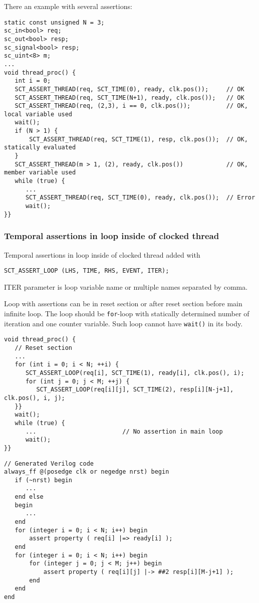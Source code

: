 There an example with several assertions:

\begin{lstlisting}[style=mycpp]
static const unsigned N = 3;
sc_in<bool> req;
sc_out<bool> resp;
sc_signal<bool> resp;
sc_uint<8> m;
...
void thread_proc() {
   int i = 0;
   SCT_ASSERT_THREAD(req, SCT_TIME(0), ready, clk.pos());     // OK
   SCT_ASSERT_THREAD(req, SCT_TIME(N+1), ready, clk.pos());   // OK 
   SCT_ASSERT_THREAD(req, (2,3), i == 0, clk.pos());          // OK, local variable used
   wait();
   if (N > 1) {
       SCT_ASSERT_THREAD(req, SCT_TIME(1), resp, clk.pos());  // OK, statically evaluated
   }
   SCT_ASSERT_THREAD(m > 1, (2), ready, clk.pos())            // OK, member variable used
   while (true) {   
      ...
      SCT_ASSERT_THREAD(req, SCT_TIME(0), ready, clk.pos());  // Error
      wait();
}}
\end{lstlisting}

\subsubsection{Temporal assertions in loop inside of clocked thread}

Temporal assertions in loop inside of clocked thread added with 
\begin{lstlisting}[style=mycpp]
SCT_ASSERT_LOOP (LHS, TIME, RHS, EVENT, ITER);
\end{lstlisting}
%
ITER parameter is loop variable name or multiple names separated by comma.

Loop with assertions can be in reset section or after reset section before main infinite loop. The loop should be {\tt for}-loop with statically determined number of iteration and one counter variable. Such loop cannot have {\tt wait()} in its body. 

\begin{lstlisting}[style=mycpp]
void thread_proc() {
   // Reset section
   ...
   for (int i = 0; i < N; ++i) {
      SCT_ASSERT_LOOP(req[i], SCT_TIME(1), ready[i], clk.pos(), i);
      for (int j = 0; j < M; ++j) {
         SCT_ASSERT_LOOP(req[i][j], SCT_TIME(2), resp[i][N-j+1], clk.pos(), i, j);
   }}
   wait();                        
   while (true) { 
      ...                        // No assertion in main loop 
      wait();
}}
\end{lstlisting}
%
\begin{lstlisting}[style=myverilog]
// Generated Verilog code
always_ff @(posedge clk or negedge nrst) begin
   if (~nrst) begin
      ...
   end else 
   begin 
      ... 
   end 
   for (integer i = 0; i < N; i++) begin
       assert property ( req[i] |=> ready[i] );  
   end 
   for (integer i = 0; i < N; i++) begin
       for (integer j = 0; j < M; j++) begin
           assert property ( req[i][j] |-> ##2 resp[i][M-j+1] );  
       end
   end 
end
\end{lstlisting}




